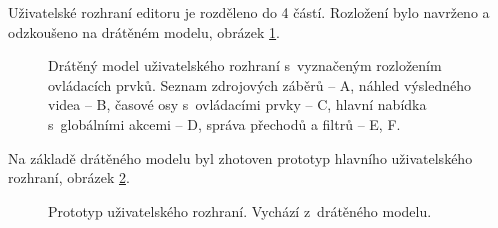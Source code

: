 Uživatelské rozhraní editoru je rozděleno do 4 částí. Rozložení bylo navrženo a odzkoušeno na drátěném modelu, obrázek \ref{img:wireframe}.
\begin{figure}[h]
	\centering
	\caption{Drátěný model uživatelského rozhraní s~vyznačeným rozložením ovládacích prvků. Seznam zdrojových záběrů -- A, náhled výsledného videa -- B, časové osy s~ovládacími prvky -- C, hlavní nabídka s~globálními akcemi -- D, správa přechodů a filtrů -- E, F.}\label{img:wireframe}
\end{figure}
Na základě drátěného modelu byl zhotoven prototyp hlavního uživatelského rozhraní, obrázek \ref{img:mockup}.
\begin{figure}[!h]
	\centering
	\caption{Prototyp uživatelského rozhraní. Vychází z~drátěného modelu.}\label{img:mockup}
\end{figure}

